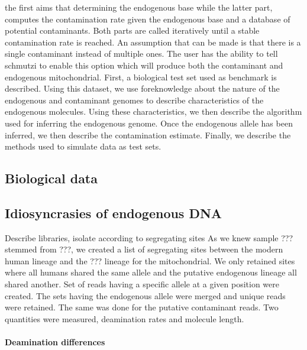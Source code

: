 \documentclass[a4paper,12pt]{article}
\begin{document}
\begin{itemize}

\begin{itemize}

 

the first aims that determining the endogenous base while the latter part, computes the contamination rate given the endogenous base and a database of potential contaminants. Both parts are called iteratively until a stable contamination rate is reached. An assumption that can be made is that there is a single contaminant instead of multiple ones. The user has the ability to tell schmutzi to enable this option which will produce both the contaminant and endogenous mitochondrial. First, a biological test set used as benchmark is described. Using this dataset, we use foreknowledge about the nature of the endogenous and contaminant genomes to describe characteristics of the endogenous molecules. Using these characteristics, we then describe the algorithm used for inferring the endogenous genome. Once the endogenous allele has been inferred, we then describe the contamination estimate. Finally, we describe the methods used to simulate data as test sets.


\subsection{Biological data}
\label{seq:biologicaldata}


\subsection{Idiosyncrasies of endogenous DNA}
\label{seq:endodeampattern}
Describe libraries, isolate according to segregating sites
As we knew sample ??? stemmed from ???, we created a list of segregating sites between the modern human lineage and the ??? lineage for the mitochondrial. We only retained sites where all humans shared the same allele and the putative endogenous lineage all shared another. Set of reads having a specific allele at a given position were created. The sets having the endogenous allele were merged and unique reads were retained. The same was done for the putative contaminant reads. Two quantities were measured, deamination rates and molecule length. 

\noindent \paragraph{Deamination differences}


\end{itemize}
\end{itemize}
\end{document}
